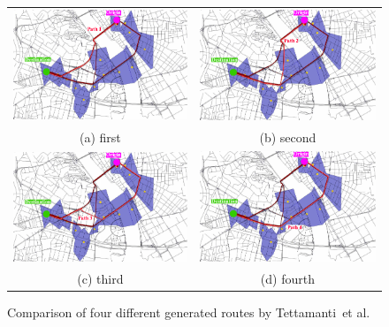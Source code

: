 \documentclass[master,english]{hgbthesis}
\begin{document}
\begin{figure}
\begin{tabular}{cc}
  \includegraphics[width=65mm]{./images/tattipath0.pdf} 
  &   \includegraphics[width=65mm]{./images/tattipath1.pdf} \\
(a) first & (b) second \\[6pt]
 \includegraphics[width=65mm]{./images/tattipath2.pdf} 
 &   \includegraphics[width=65mm]{./images/tattipath3.pdf} \\
(c) third & (d) fourth \\[6pt]
\end{tabular}
\caption{Comparison of four different generated routes by Tettamanti~et al.\ \cite{Tettamanti2012}}
\label{fig:tettaroutes}
\end{figure}
\end{document}
